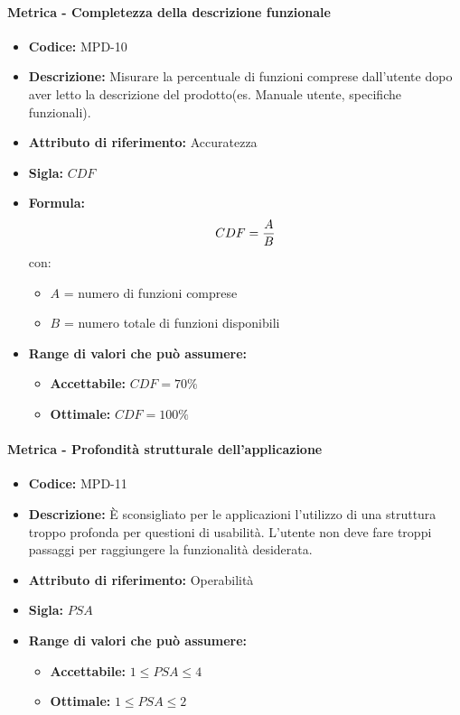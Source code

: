     \paragraph{Metrica - Completezza della descrizione funzionale} 
        \begin{itemize}
            \item   \textbf{Codice:} MPD-10
            \item   \textbf{Descrizione:} Misurare la percentuale di funzioni comprese dall'utente dopo aver letto la descrizione del prodotto(es. Manuale utente, specifiche funzionali).
            \item    \textbf{Attributo di riferimento:} Accuratezza
            \item   \textbf{Sigla:} $CDF$
            \item   \textbf{Formula:} $$CDF = {A \over B}$$
            con:
            \begin{itemize}
            \item  $A$ = numero di funzioni comprese
            \item  $B$ = numero totale di funzioni disponibili
            \end{itemize}

            \item \textbf{Range di valori che può assumere:}
            \begin{itemize}
                \item \textbf{Accettabile:} $CDF = 70\% $
                \item \textbf{Ottimale:} $CDF = 100\% $
            \end{itemize}
        \end{itemize}

    \paragraph{Metrica - Profondità strutturale dell'applicazione}
    \begin{itemize}
        \item \textbf{Codice:} MPD-11
        \item \textbf{Descrizione:} È sconsigliato per le applicazioni l'utilizzo di una struttura troppo profonda per questioni di usabilità. L'utente non deve fare troppi passaggi per raggiungere la funzionalità desiderata. 
        \item \textbf{Attributo di riferimento:} Operabilità
        \item \textbf{Sigla:} $PSA$
        \item \textbf{Range di valori che può assumere:}
        \begin{itemize}
            \item \textbf{Accettabile:} $1 \leq PSA \leq 4$
            \item \textbf{Ottimale:} $1 \leq PSA \leq 2$
        \end{itemize}
    \end{itemize}

